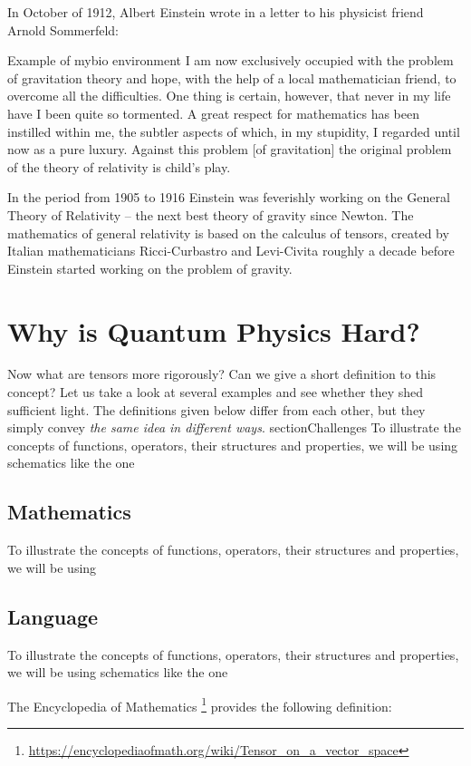 In October of 1912, Albert Einstein wrote in a letter to his physicist
friend Arnold Sommerfeld:
\begin{mybio}{Example of mybio environment}
  I am now exclusively occupied with the problem of gravitation theory
and hope, with the help of a local mathematician friend, to overcome
all the difficulties. One thing is certain, however, that never in my
life have I been quite so tormented. A great respect for mathematics
has been instilled within me, the subtler aspects of which, in my stupidity,
I regarded until now as a pure luxury. Against this problem [of
  gravitation] the original problem of the theory of relativity is
child’s play.
\end{mybio}
In the period from 1905 to 1916 Einstein was feverishly working on the
General Theory of Relativity -- the next
best theory of gravity since
Newton. The mathematics of general relativity is based on the calculus
of tensors, created by Italian mathematicians Ricci-Curbastro and
Levi-Civita roughly a decade before Einstein started working on the
problem of gravity.


\section{Why is Quantum Physics Hard?}\label{sec:WhyQuantumHard}
Now what are tensors more rigorously? Can we give a short definition
to this concept?
Let us take a look at several examples and see whether they shed
sufficient light. The definitions given below differ from each other,
but they simply convey \emph{the same idea in different ways}.
section{Challenges}
To illustrate the concepts of functions, operators, their structures and
properties, we will be using schematics like the one

\subsection{Mathematics}
To illustrate the concepts of functions, operators, their structures and
properties, we will be using 

\subsection{Language}
To illustrate the concepts of functions, operators, their structures and
properties, we will be using schematics like the one

The Encyclopedia of Mathematics
\footnote{\url{https://encyclopediaofmath.org/wiki/Tensor_on_a_vector_space}}
provides the following definition:

